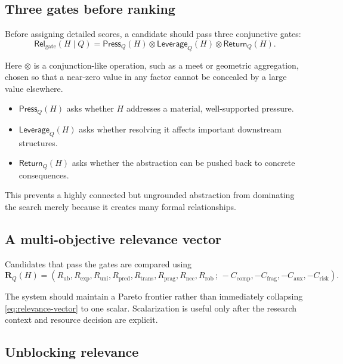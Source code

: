 \documentclass[11pt]{article}
\newcommand{\Rel}{\mathsf{Rel}}
\newcommand{\Press}{\mathsf{Press}}
\begin{document}
\subsection{Three gates before ranking}

Before assigning detailed scores, a candidate should pass three conjunctive gates:
\begin{equation}
\Rel_{\mathrm{gate}}(H\mid Q)
=
\Press_Q(H)\otimes
\mathsf{Leverage}_Q(H)\otimes
\mathsf{Return}_Q(H).
\end{equation}

Here $\otimes$ is a conjunction-like operation, such as a meet or geometric aggregation, chosen so
that a near-zero value in any factor cannot be concealed by a large value elsewhere.
\begin{itemize}
  \item $\Press_Q(H)$ asks whether $H$ addresses a material, well-supported pressure.
  \item $\mathsf{Leverage}_Q(H)$ asks whether resolving it affects important downstream structures.
  \item $\mathsf{Return}_Q(H)$ asks whether the abstraction can be pushed back to concrete
  consequences.
\end{itemize}

This prevents a highly connected but ungrounded abstraction from dominating the search merely because
it creates many formal relationships.

\subsection{A multi-objective relevance vector}

Candidates that pass the gates are compared using
\begin{equation}
\mathbf{R}_Q(H)=
\left(
R_{\mathrm{ub}},R_{\mathrm{exp}},R_{\mathrm{uni}},R_{\mathrm{pred}},
R_{\mathrm{trans}},R_{\mathrm{prag}},R_{\mathrm{nec}},R_{\mathrm{rob}}
\,;\,
-C_{\mathrm{comp}},-C_{\mathrm{frag}},-C_{\mathrm{aux}},-C_{\mathrm{risk}}
\right).
\label{eq:relevance-vector}
\end{equation}

The system should maintain a Pareto frontier rather than immediately collapsing
\eqref{eq:relevance-vector} to one scalar. Scalarization is useful only after the research context and
resource decision are explicit.

\subsection{Unblocking relevance}
\end{document}

